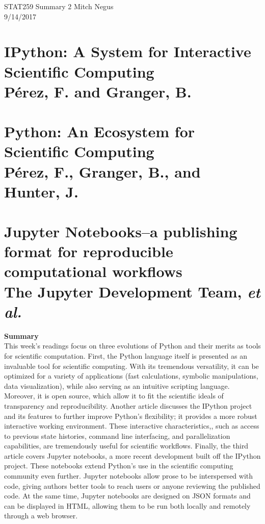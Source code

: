 \documentclass{report}
\newcommand{\tab}{\-\hspace{1cm}}
\begin{document}
\thispagestyle{empty}
\sffamily

\large {STAT259 Summary {2} \hfill Mitch Negus\\
		\hspace*{\fill} 9/14/2017\\ }
\section*{\textsf{IPython: A System for Interactive Scientific Computing \\ \normalsize P\'erez, F. and Granger, B.}}
\section*{\textsf{Python: An Ecosystem for Scientific Computing \\ \normalsize P\'erez, F., Granger, B., and Hunter, J.}}
\section*{\textsf{Jupyter Notebooks--a publishing format for reproducible computational workflows \\ \normalsize The Jupyter Development Team,} \small \textit{et al.}}

\textbf{Summary}\\
\tab This week's readings focus on three evolutions of Python and their merits as tools for scientific computation. First, the Python language itself is presented as an invaluable tool for scientific computing. With its tremendous versatility, it can be optimized for a variety of applications (fast calculations, symbolic manipulations, data visualization), while also serving as an intuitive scripting language. Moreover, it is open source, which allow it to fit the scientific ideals of transparency and reproducibility. Another article discusses the IPython project and its features to further improve Python's flexibility; it provides a more robust interactive working environment. These interactive characteristics,, such as access to previous state histories, command line interfacing, and parallelization capabilities, are tremendously useful for scientific workflows. Finally, the third article covers Jupyter notebooks, a more recent development built off the IPython project. These notebooks extend Python's use in the scientific computing community even further. Jupyter notebooks allow prose to be interspersed with code, giving authors better tools to reach users or anyone reviewing the published code. At the same time, Jupyter notebooks are designed on JSON formats and can be displayed in HTML, allowing them to be run both locally and remotely through a web browser.
\end{document}
